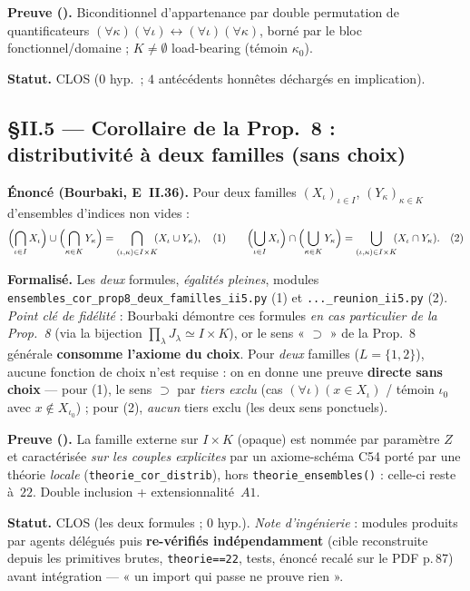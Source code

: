 \textbf{Preuve (\Nstar).} Biconditionnel d'appartenance par double permutation de
quantificateurs $(\forall\kappa)(\forall\iota)\leftrightarrow(\forall\iota)(\forall\kappa)$,
borné par le bloc fonctionnel/domaine ; $K\neq\emptyset$ load-bearing (témoin $\kappa_0$).

\textbf{Statut.} CLOS ($0$ hyp.\ ; $4$ antécédents honnêtes déchargés en implication).

\subsection{§II.5 --- Corollaire de la Prop.~8 : distributivité à deux familles (sans choix)}
\textbf{Énoncé (Bourbaki, E~II.36).} Pour deux familles $(X_\iota)_{\iota\in I}$,
$(Y_\kappa)_{\kappa\in K}$ d'ensembles d'indices non vides :
\[
  \Bigl(\bigcap_{\iota\in I}X_\iota\Bigr)\cup\Bigl(\bigcap_{\kappa\in K}Y_\kappa\Bigr)
  =\bigcap_{(\iota,\kappa)\in I\times K}\!\!(X_\iota\cup Y_\kappa),\quad(1)\qquad
  \Bigl(\bigcup_{\iota\in I}X_\iota\Bigr)\cap\Bigl(\bigcup_{\kappa\in K}Y_\kappa\Bigr)
  =\bigcup_{(\iota,\kappa)\in I\times K}\!\!(X_\iota\cap Y_\kappa).\quad(2)
\]

\textbf{Formalisé.} Les \emph{deux} formules, \emph{égalités pleines}, modules
\texttt{ensembles\_cor\_prop8\_deux\_familles\_ii5.py} (1) et
\texttt{...\_reunion\_ii5.py} (2). \emph{Point clé de fidélité} : Bourbaki démontre ces
formules \emph{en cas particulier de la Prop.~8} (via la bijection $\prod_\lambda J_\lambda
\simeq I\times K$), or le sens « $\supset$ » de la Prop.~8 générale \textbf{consomme l'axiome
du choix}. Pour \emph{deux} familles ($L=\{1,2\}$), aucune fonction de choix n'est requise :
on en donne une preuve \textbf{directe sans choix} --- pour (1), le sens $\supset$ par
\emph{tiers exclu} (cas $(\forall\iota)(x\in X_\iota)$ / témoin $\iota_0$ avec
$x\notin X_{\iota_0}$) ; pour (2), \emph{aucun} tiers exclu (les deux sens ponctuels).

\textbf{Preuve (\Nstar).} La famille externe sur $I\times K$ (opaque) est nommée par
paramètre $Z$ et caractérisée \emph{sur les couples explicites} par un axiome-schéma C54
porté par une théorie \emph{locale} (\texttt{theorie\_cor\_distrib}), hors
\texttt{theorie\_ensembles()} : celle-ci reste à~$22$. Double inclusion + extensionnalité~$A1$.

\textbf{Statut.} CLOS (les deux formules ; $0$ hyp.). \emph{Note d'ingénierie} : modules
produits par agents délégués puis \textbf{re-vérifiés indépendamment} (cible reconstruite
depuis les primitives brutes, \texttt{theorie==22}, tests, énoncé recalé sur le PDF p.\,87)
avant intégration --- « un import qui passe ne prouve rien ».
